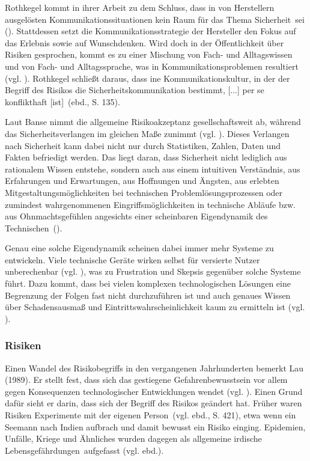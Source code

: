 Rothkegel kommt in ihrer Arbeit zu dem Schluss, dass in von Herstellern ausgelösten Kommunikationssituationen \glqq kein Raum für das Thema Sicherheit\grqq \, sei (\cite[132]{rothkegel2013sicherheitskommunikation}). Stattdessen setzt die Kommunikationsstrategie der Hersteller den Fokus auf das Erlebnis sowie auf Wunschdenken. Wird doch in der Öffentlichkeit über Risiken gesprochen, kommt es zu einer Mischung von Fach- und Alltagswissen und von Fach- und Alltagssprache, was in Kommunikationsproblemen resultiert (vgl. \cite[134]{rothkegel2013sicherheitskommunikation}). Rothkegel schließt daraus, dass \glqq [e]ine Kommunikationskultur, in der der Begriff des Risikos die Sicherheitskommunikation bestimmt, [...] per se konflikthaft [ist]\grqq \, (ebd., S. 135).

Laut Banse nimmt die allgemeine Risikoakzeptanz gesellschaftsweit ab, während das Sicherheitsverlangen im gleichen Maße zunimmt (vgl. \cite[3]{banse2018technik}). Dieses Verlangen nach Sicherheit kann dabei nicht nur durch Statistiken, Zahlen, Daten und Fakten befriedigt werden. Das liegt daran, dass Sicherheit nicht lediglich aus rationalem Wissen entstehe, sondern auch aus \glqq einem intuitiven Verständnis, aus Erfahrungen und Erwartungen, aus Hoffnungen und Ängsten, aus erlebten Mitgestaltungsmöglichkeiten bei technischen Problemlösungsprozessen oder zumindest wahrgenommenen Eingriffsmöglichkeiten in technische Abläufe bzw. aus Ohnmachtsgefühlen angesichts einer scheinbaren Eigendynamik des Technischen\grqq \, (\cite[4]{banse2018technik}).

Genau eine solche Eigendynamik scheinen dabei immer mehr Systeme zu entwickeln. Viele technische Geräte wirken selbst für versierte Nutzer unberechenbar (vgl. \cite[5]{norman2013design}), was zu Frustration und Skepsis gegenüber solche Systeme führt. Dazu kommt, dass bei vielen komplexen technologischen Lösungen eine Begrenzung der Folgen fast nicht durchzuführen ist und auch genaues Wissen über Schadensausmaß und Eintrittswahrscheinlichkeit kaum zu ermitteln ist (vgl. \cite[12]{banse2018technik}).

\subsubsection*{Risiken}

Einen Wandel des Risikobegriffs in den vergangenen Jahrhunderten bemerkt Lau (1989). Er stellt fest, dass sich das gestiegene Gefahrenbewusstsein vor allem gegen Konsequenzen technologischer Entwicklungen wendet (vgl. \cite[418]{lau1989risikodiskurse}). Einen Grund dafür sieht er darin, dass sich der Begriff des Risikos geändert hat. Früher waren Risiken \glqq Experimente mit der eigenen Person\grqq \, (vgl. ebd., S. 421), etwa wenn ein Seemann nach Indien aufbrach und damit bewusst ein Risiko einging. Epidemien, Unfälle, Kriege und Ähnliches wurden dagegen als \glqq allgemeine irdische Lebensgefährdungen\grqq \, aufgefasst (vgl. ebd.).

